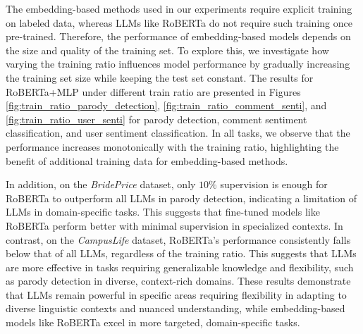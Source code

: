 



The embedding-based methods used in our experiments require explicit training on labeled data, whereas LLMs like RoBERTa do not require such training once pre-trained. Therefore, the performance of embedding-based models depends on the size and quality of the training set. To explore this, we investigate how varying the training ratio influences model performance by gradually increasing the training set size while keeping the test set constant. The results for RoBERTa+MLP under different train ratio are presented in Figures \ref{fig:train_ratio_parody_detection}, \ref{fig:train_ratio_comment_senti}, and \ref{fig:train_ratio_user_senti} for parody detection, comment sentiment classification, and user sentiment classification. In all tasks, we observe that the performance increases monotonically with the training ratio, highlighting the benefit of additional training data for embedding-based methods.

In addition, on the \textit{BridePrice} dataset, only $10\%$ supervision is enough for RoBERTa to outperform all LLMs in parody detection, indicating a limitation of LLMs in domain-specific tasks. This suggests that fine-tuned models like RoBERTa perform better with minimal supervision in specialized contexts. In contrast, on the \textit{CampusLife} dataset, RoBERTa's performance consistently falls below that of all LLMs, regardless of the training ratio. This suggests that LLMs are more effective in tasks requiring generalizable knowledge and flexibility, such as parody detection in diverse, context-rich domains. These results demonstrate that LLMs remain powerful in specific areas requiring flexibility in adapting to diverse linguistic contexts and nuanced understanding, while embedding-based models like RoBERTa excel in more targeted, domain-specific tasks.
